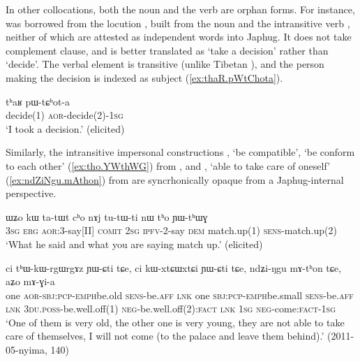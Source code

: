 In other collocations, both the noun and the verb are orphan forms. For instance,  was borrowed from the locution , built from the noun  and the intransitive verb , neither of which are attested as independent words into Japhug.   It does not take complement clause, and is better translated as `take a decision' rather than `decide'. The verbal element  is transitive (unlike Tibetan ), and the person making the decision is indexed as subject (\ref{ex:thaR.pWtChota}).
 
\begin{exe}
\ex \label{ex:thaR.pWtChota}
\gll tʰaʁ pɯ-tɕʰot-a \\
decide(1) \textsc{aor}-decide(2)-\textsc{1sg} \\
\glt `I took a decision.' (elicited)
  \end{exe}  

Similarly, the intransitive impersonal constructions  , `be compatible', `be conform to each other' (\ref{ex:tho.YWthWG}) from , and  , `able to take care of oneself' (\ref{ex:ndZiNgu.mAthon}) from  are syncrhonically opaque from a Japhug-internal perspective.
 
 
\begin{exe}
\ex \label{ex:tho.YWthWG}
\gll ɯʑo kɯ ta-tɯt cʰo nɤj tu-tɯ-ti nɯ tʰo ɲɯ-tʰɯɣ \\
\textsc{3sg} \textsc{erg} \textsc{aor}:3\flobv{}-say[II] \textsc{comit} \textsc{2sg} \textsc{ipfv}-2-say \textsc{dem} match.up(1) \textsc{sens}-match.up(2) \\
\glt `What he said and what you are saying match up.' (elicited)
\end{exe}  
 

\begin{exe}
\ex \label{ex:ndZiNgu.mAthon}
\gll   ci tʰɯ-kɯ-rgɯ\redp{}rgɤz ɲɯ-ɕti tɕe, ci kɯ-xtɕɯ\redp{}xtɕi ɲɯ-ɕti tɕe, ndʑi-ŋgu mɤ-tʰon tɕe, aʑo mɤ-ɣi-a \\
one \textsc{aor}-\textsc{sbj}:\textsc{pcp}-\textsc{emph}\redp{}be.old \textsc{sens}-be.\textsc{aff} \textsc{lnk} one \textsc{sbj}:\textsc{pcp}-\textsc{emph}\redp{}be.small \textsc{sens}-be.\textsc{aff} \textsc{lnk} \textsc{3du}.\textsc{poss}-be.well.off(1) \textsc{neg}-be.well.off(2):\textsc{fact} \textsc{lnk} \textsc{1sg} \textsc{neg}-come:\textsc{fact}-\textsc{1sg} \\
\glt `One of them is very old, the other one is very young, they are not able to take care of themselves, I will not come (to the palace and leave them behind).' (2011-05-nyima, 140)
\end{exe}  
  
